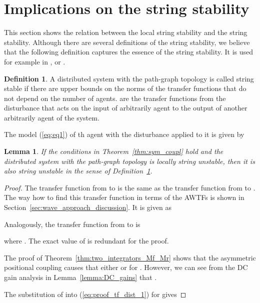 \documentclass[10pt,twocolumn,twoside]{IEEEtran}
\newtheorem{lemma}{Lemma}
\theoremstyle{definition}
\newtheorem{defn}{Definition}
\newcommand{\revA}{Black}
\begin{document}
{\color{\revA}
\section{Implications on the string stability}

This section shows the relation between the local string stability and the string stability. Although there are several definitions of the string stability, we believe that the following definition captures the essence of the string stability. It is used for example in \cite{Ploeg2014}, \cite{Seiler2004a} or \cite{Eyre1998a}.
\begin{defn} \label{def:string_stability_classic}
  A distributed system with the path-graph topology is called string stable if there are upper bounds on the  norms of the transfer functions  that do not depend on the number of agents.  are the transfer functions from the disturbance that acts on the input of arbitrarily agent to the output of another arbitrarily agent of the system.
\end{defn}



The model (\ref{eq:eq1}) of th agent with the disturbance  applied to it is given by







\begin{lemma}\label{lemma:connection_to_string_stability}
  If the conditions in Theorem~\ref{thm:sym_coupl} hold and the distributed system with the path-graph topology is locally string unstable, then it is also string unstable in the sense of Definition~\ref{def:string_stability_classic}.
\end{lemma}
\begin{proof}
The transfer function from  to  is the same as the transfer function from  to . The way how to find this transfer function in terms of the AWTFs is shown in Section~\ref{sec:wave_approach_discussion}. It is given as
  
Analogously, the transfer function from  to  is

where . The exact value of  is redundant for the proof.

The proof of Theorem~\ref{thm:two_integrators_Mf_Mr} shows that the asymmetric positional coupling causes that either  or  for . However, we can see from the DC gain analysis in Lemma~\ref{lemma:DC_gains} that .

The substitution of  into (\ref{eq:proof_tf_dist_1}) for  gives


\end{proof}}
\end{document}
